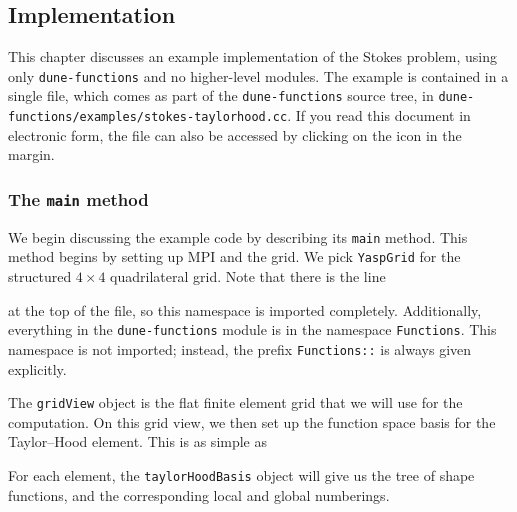 \documentclass[a4paper,10pt,headings=normal,bibliography=totoc]{scrartcl}
\newcommand{\cpp}[1]{\lstinline[basicstyle=\ttfamily]!#1!}
\newcommand{\dunemodule}[1]{\texttt{#1}}
\newcommand{\file}[1]{\texttt{#1}}
\begin{document}
\subsection{Implementation}

This chapter discusses an example implementation of the Stokes problem, using only \dunemodule{dune-functions}
and no higher-level modules.  The example is contained in a single file, which comes as part of the \dunemodule{dune-functions}
source tree, in \file{dune-functions/examples/stokes-taylorhood.cc}.  If you read this document in electronic form,
the file can also be accessed by clicking on the icon in the margin.%
%

\subsubsection{The \texorpdfstring{\cpp{main}}{main} method}

We begin discussing the example code by describing its \cpp{main} method.  This method begins by setting up MPI and the grid.
We pick \cpp{YaspGrid} for the structured $4 \times 4$ quadrilateral grid.  Note that there is the line
%

%
at the top of the file, so this namespace is imported completely.  Additionally, everything in the \dunemodule{dune-functions}
module is in the namespace \cpp{Functions}.  This namespace is not imported; instead, the prefix \cpp{Functions::} is always
given explicitly.


%

%
The \cpp{gridView} object is the flat finite element grid that we will use for
the computation.
On this grid view, we then set up the function space basis for the Taylor--Hood element.  This is as simple as
%

%
For each element, the \cpp{taylorHoodBasis} object will give us the tree of shape functions, and the corresponding local and global numberings.
\end{document}
